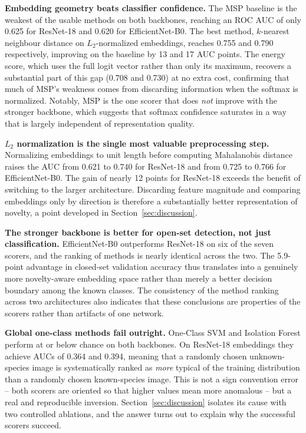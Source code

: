 \documentclass[11pt]{article}
\begin{document}
\textbf{Embedding geometry beats classifier confidence.} The MSP baseline is the weakest of the usable methods on both backbones, reaching an ROC AUC of only 0.625 for ResNet-18 and 0.620 for EfficientNet-B0. The best method, $k$-nearest neighbour distance on $L_2$-normalized embeddings, reaches 0.755 and 0.790 respectively, improving on the baseline by 13 and 17 AUC points. The energy score, which uses the full logit vector rather than only its maximum, recovers a substantial part of this gap (0.708 and 0.730) at no extra cost, confirming that much of MSP's weakness comes from discarding information when the softmax is normalized. Notably, MSP is the one scorer that does \emph{not} improve with the stronger backbone, which suggests that softmax confidence saturates in a way that is largely independent of representation quality.

\textbf{$L_2$ normalization is the single most valuable preprocessing step.} Normalizing embeddings to unit length before computing Mahalanobis distance raises the AUC from 0.621 to 0.740 for ResNet-18 and from 0.725 to 0.766 for EfficientNet-B0. The gain of nearly 12 points for ResNet-18 exceeds the benefit of switching to the larger architecture. Discarding feature magnitude and comparing embeddings only by direction is therefore a substantially better representation of novelty, a point developed in Section~\ref{sec:discussion}.

\textbf{The stronger backbone is better for open-set detection, not just classification.} EfficientNet-B0 outperforms ResNet-18 on six of the seven scorers, and the ranking of methods is nearly identical across the two. The 5.9-point advantage in closed-set validation accuracy thus translates into a genuinely more novelty-aware embedding space rather than merely a better decision boundary among the known classes. The consistency of the method ranking across two architectures also indicates that these conclusions are properties of the scorers rather than artifacts of one network.

\textbf{Global one-class methods fail outright.} One-Class SVM and Isolation Forest perform at or below chance on both backbones. On ResNet-18 embeddings they achieve AUCs of 0.364 and 0.394, meaning that a randomly chosen unknown-species image is systematically ranked as \emph{more} typical of the training distribution than a randomly chosen known-species image. This is not a sign convention error -- both scorers are oriented so that higher values mean more anomalous -- but a real and reproducible inversion. Section~\ref{sec:discussion} isolates its cause with two controlled ablations, and the answer turns out to explain why the successful scorers succeed.
\end{document}
